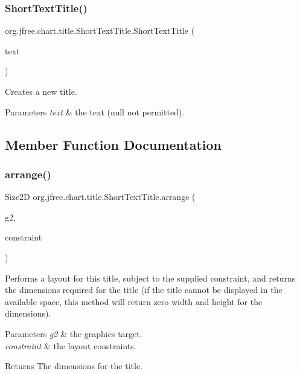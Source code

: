 \subsubsection{\texorpdfstring{Short\+Text\+Title()}{ShortTextTitle()}}
{\footnotesize\ttfamily org.\+jfree.\+chart.\+title.\+Short\+Text\+Title.\+Short\+Text\+Title (\begin{DoxyParamCaption}\item[{String}]{text }\end{DoxyParamCaption})}

Creates a new title.


\begin{DoxyParams}{Parameters}
{\em text} & the text ({\ttfamily null} not permitted). \\
\hline
\end{DoxyParams}


\subsection{Member Function Documentation}
\mbox{\label{classorg_1_1jfree_1_1chart_1_1title_1_1_short_text_title_aed42f3ff529f06abb2bc28f0ed8e15a9}} 
\subsubsection{\texorpdfstring{arrange()}{arrange()}}
{\footnotesize\ttfamily Size2D org.\+jfree.\+chart.\+title.\+Short\+Text\+Title.\+arrange (\begin{DoxyParamCaption}\item[{Graphics2D}]{g2,  }\item[{\mbox{\hyperlink{classorg_1_1jfree_1_1chart_1_1block_1_1_rectangle_constraint}{Rectangle\+Constraint}}}]{constraint }\end{DoxyParamCaption})}

Performs a layout for this title, subject to the supplied constraint, and returns the dimensions required for the title (if the title cannot be displayed in the available space, this method will return zero width and height for the dimensions).


\begin{DoxyParams}{Parameters}
{\em g2} & the graphics target. \\
\hline
{\em constraint} & the layout constraints.\\
\hline
\end{DoxyParams}
\begin{DoxyReturn}{Returns}
The dimensions for the title. 
\end{DoxyReturn}


